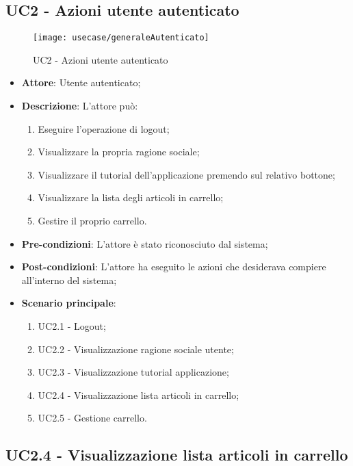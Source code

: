 \subsection{UC2 - Azioni utente autenticato}

\begin{figure}[!h] 
    \centering 
    \texttt{[image: usecase/generaleAutenticato]} 
    \caption{UC2 - Azioni utente autenticato}
    \label{fig:altoLivello2}
\end{figure}

\begin{itemize}
	\item \textbf{Attore}: Utente autenticato;
	\item \textbf{Descrizione}: L'attore può:
	\begin{enumerate}
		\item Eseguire l'operazione di logout;
		\item Visualizzare la propria ragione sociale;
		\item Visualizzare il tutorial dell'applicazione premendo sul relativo bottone;
		\item Visualizzare la lista degli articoli in carrello;
		\item Gestire il proprio carrello. 
	\end{enumerate}
	\item \textbf{Pre-condizioni}: L'attore è stato riconosciuto dal sistema;
	\item \textbf{Post-condizioni}: L'attore ha eseguito le azioni che desiderava compiere all'interno del sistema;
	\item \textbf{Scenario principale}: 
		\begin{enumerate}
			\item UC2.1 - Logout;
			\item UC2.2 - Visualizzazione ragione sociale utente;
			\item UC2.3 - Visualizzazione tutorial applicazione;
			\item UC2.4 - Visualizzazione lista articoli in carrello;
			\item UC2.5 - Gestione carrello.
		\end{enumerate}
\end{itemize}

\subsection{UC2.4 - Visualizzazione lista articoli in carrello}

